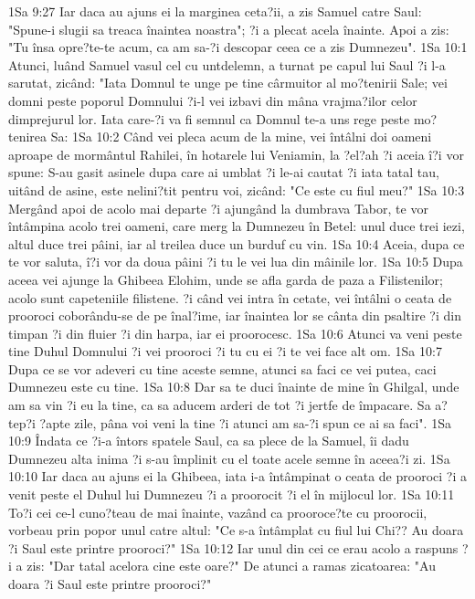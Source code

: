 1Sa 9:27  Iar daca au ajuns ei la marginea ceta?ii, a zis Samuel catre Saul: "Spune-i slugii sa treaca înaintea noastra"; ?i a plecat acela înainte. Apoi a zis: "Tu însa opre?te-te acum, ca am sa-?i descopar ceea ce a zis Dumnezeu".
1Sa 10:1  Atunci, luând Samuel vasul cel cu untdelemn, a turnat pe capul lui Saul ?i l-a sarutat, zicând: "Iata Domnul te unge pe tine cârmuitor al mo?tenirii Sale; vei domni peste poporul Domnului ?i-l vei izbavi din mâna vrajma?ilor celor dimprejurul lor. Iata care-?i va fi semnul ca Domnul te-a uns rege peste mo?tenirea Sa:
1Sa 10:2  Când vei pleca acum de la mine, vei întâlni doi oameni aproape de mormântul Rahilei, în hotarele lui Veniamin, la ?el?ah ?i aceia î?i vor spune: S-au gasit asinele dupa care ai umblat ?i le-ai cautat ?i iata tatal tau, uitând de asine, este nelini?tit pentru voi, zicând: "Ce este cu fiul meu?"
1Sa 10:3  Mergând apoi de acolo mai departe ?i ajungând la dumbrava Tabor, te vor întâmpina acolo trei oameni, care merg la Dumnezeu în Betel: unul duce trei iezi, altul duce trei pâini, iar al treilea duce un burduf cu vin.
1Sa 10:4  Aceia, dupa ce te vor saluta, î?i vor da doua pâini ?i tu le vei lua din mâinile lor.
1Sa 10:5  Dupa aceea vei ajunge la Ghibeea Elohim, unde se afla garda de paza a Filistenilor; acolo sunt capeteniile filistene. ?i când vei intra în cetate, vei întâlni o ceata de prooroci coborându-se de pe înal?ime, iar înaintea lor se cânta din psaltire ?i din timpan ?i din fluier ?i din harpa, iar ei proorocesc.
1Sa 10:6  Atunci va veni peste tine Duhul Domnului ?i vei prooroci ?i tu cu ei ?i te vei face alt om.
1Sa 10:7  Dupa ce se vor adeveri cu tine aceste semne, atunci sa faci ce vei putea, caci Dumnezeu este cu tine.
1Sa 10:8  Dar sa te duci înainte de mine în Ghilgal, unde am sa vin ?i eu la tine, ca sa aducem arderi de tot ?i jertfe de împacare. Sa a?tep?i ?apte zile, pâna voi veni la tine ?i atunci am sa-?i spun ce ai sa faci".
1Sa 10:9  Îndata ce ?i-a întors spatele Saul, ca sa plece de la Samuel, îi dadu Dumnezeu alta inima ?i s-au împlinit cu el toate acele semne în aceea?i zi.
1Sa 10:10  Iar daca au ajuns ei la Ghibeea, iata i-a întâmpinat o ceata de prooroci ?i a venit peste el Duhul lui Dumnezeu ?i a proorocit ?i el în mijlocul lor.
1Sa 10:11  To?i cei ce-l cuno?teau de mai înainte, vazând ca prooroce?te cu proorocii, vorbeau prin popor unul catre altul: "Ce s-a întâmplat cu fiul lui Chi?? Au doara ?i Saul este printre prooroci?"
1Sa 10:12  Iar unul din cei ce erau acolo a raspuns ?i a zis: "Dar tatal acelora cine este oare?" De atunci a ramas zicatoarea: "Au doara ?i Saul este printre prooroci?"
